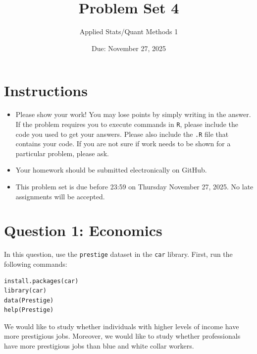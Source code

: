\documentclass[12pt,letterpaper]{article}
\title{Problem Set 4}
\date{Due: November 27, 2025}
\author{Applied Stats/Quant Methods 1}
\begin{document}
	\maketitle
	\section*{Instructions}
	\begin{itemize}
		\item Please show your work! You may lose points by simply writing in the answer. If the problem requires you to execute commands in \texttt{R}, please include the code you used to get your answers. Please also include the \texttt{.R} file that contains your code. If you are not sure if work needs to be shown for a particular problem, please ask.
		\item Your homework should be submitted electronically on GitHub.
		\item This problem set is due before 23:59 on Thursday November 27, 2025. No late assignments will be accepted.
	\end{itemize}



	\vspace{.5cm}
\section*{Question 1: Economics}
\vspace{.25cm}
\noindent 	
In this question, use the \texttt{prestige} dataset in the \texttt{car} library. First, run the following commands:

\begin{verbatim}
install.packages(car)
library(car)
data(Prestige)
help(Prestige)
\end{verbatim} 


\noindent We would like to study whether individuals with higher levels of income have more prestigious jobs. Moreover, we would like to study whether professionals have more prestigious jobs than blue and white collar workers.
\end{document}
